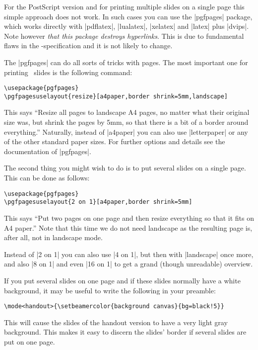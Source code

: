 For the PostScript version and for printing multiple slides on a single page this simple approach does not work. In such cases you can use the |pgfpages| package, which works directly with |pdflatex|, |lualatex|, |xelatex| and |latex| plus |dvips|. Note however \emph{that this package destroys hyperlinks}. This is due to fundamental flaws in the \pdf-specification and it is not likely to change.

The |pgfpages| can do all sorts of tricks with pages. The most important one for printing \beamer\ slides is the following command:
\begin{verbatim}
\usepackage{pgfpages}
\pgfpagesuselayout{resize}[a4paper,border shrink=5mm,landscape]
\end{verbatim}
This says ``Resize all pages to landscape A4 pages, no matter what their original size was, but shrink the pages by 5mm, so that there is a bit of a border around everything.'' Naturally, instead of |a4paper| you can also use |letterpaper| or any of the other standard paper sizes. For further options and details see the documentation of |pgfpages|.

The second thing you might wish to do is to put several slides on a single page. This can be done as follows:
\begin{verbatim}
\usepackage{pgfpages}
\pgfpagesuselayout{2 on 1}[a4paper,border shrink=5mm]
\end{verbatim}
This says ``Put two pages on one page and then resize everything so that it fits on A4 paper.'' Note that this time we do not need landscape as the resulting page is, after all, not in landscape mode.

Instead of |2 on 1| you can also use |4 on 1|, but then with |landscape| once more, and also |8 on 1| and even |16 on 1| to get a grand (though unreadable) overview.

If you put several slides on one page and if these slides normally have a white background, it may be useful to write the following in your preamble:
\begin{verbatim}
\mode<handout>{\setbeamercolor{background canvas}{bg=black!5}}
\end{verbatim}
This will cause the slides of the handout version to have a very light gray background. This makes it easy to discern the slides' border if several slides are put on one page.



